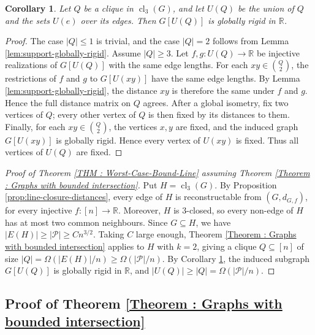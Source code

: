 \documentclass[fullpage,11pt]{article}
\theoremstyle{break}
\newtheorem{corollary}[theorem]{Corollary}
\theoremstyle{definition}
\theoremstyle{break}
\begin{document}
\begin{corollary}\label{cor:clique-support-globally-rigid}
Let \(Q\) be a clique in \(\operatorname{cl}_3(G)\), and let \(U(Q)\) be the union of \(Q\) and the sets \(U(e)\) over its edges. Then \(G[U(Q)]\) is globally rigid in \(\mathbb R\).
\end{corollary}

\begin{proof}
The case \(|Q|\leq1\) is trivial, and the case \(|Q|=2\) follows from Lemma \ref{lem:support-globally-rigid}. Assume \(|Q|\geq3\). Let \(f,g\colon U(Q)\to\mathbb R\) be injective realizations of \(G[U(Q)]\) with the same edge lengths. For each \(xy\in\binom{Q}{2}\), the restrictions of \(f\) and \(g\) to \(G[U(xy)]\) have the same edge lengths. By Lemma \ref{lem:support-globally-rigid}, the distance \(xy\) is therefore the same under \(f\) and \(g\). Hence the full distance matrix on \(Q\) agrees. After a global isometry, fix two vertices of \(Q\); every other vertex of \(Q\) is then fixed by its distances to them. Finally, for each \(xy\in\binom{Q}{2}\), the vertices \(x,y\) are fixed, and the induced graph \(G[U(xy)]\) is globally rigid. Hence every vertex of \(U(xy)\) is fixed. Thus all vertices of \(U(Q)\) are fixed.
\end{proof}

\begin{proof}[Proof of Theorem \ref{THM : Worst-Case-Bound-Line} assuming Theorem \ref{Theorem : Graphs with bounded intersection}]
Put \(H=\operatorname{cl}_3(G)\). By Proposition \ref{prop:line-closure-distances}, every edge of \(H\) is reconstructable from \((G,d_{G,f})\), for every injective \(f\colon[n]\to\mathbb R\). Moreover, \(H\) is \(3\)-closed, so every non-edge of \(H\) has at most two common neighbours. Since \(G\subseteq H\), we have \(|E(H)|\geq|\mathcal P|\geq Cn^{3/2}\). Taking \(C\) large enough, Theorem \ref{Theorem : Graphs with bounded intersection} applies to \(H\) with \(k=2\), giving a clique \(Q\subseteq[n]\) of size \(|Q|=\Omega(|E(H)|/n)\geq\Omega(|\mathcal{P}|/n)\). By Corollary \ref{cor:clique-support-globally-rigid}, the induced subgraph \(G[U(Q)]\) is globally rigid in \(\mathbb R\), and \(|U(Q)|\geq |Q|=\Omega(|\mathcal P|/n)\).
\end{proof}


\subsection{Proof of Theorem \ref{Theorem : Graphs with bounded intersection}}
\end{document}
